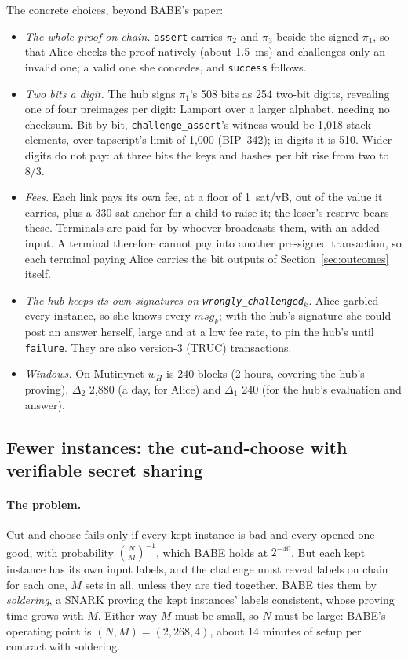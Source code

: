 \documentclass[11pt]{article}
\newcommand{\tx}[1]{\texttt{#1}}
\begin{document}
The concrete choices, beyond BABE's paper:
\begin{itemize}[leftmargin=1.5em]
\item \emph{The whole proof on chain.} \tx{assert} carries $\pi_2$ and
  $\pi_3$ beside the signed $\pi_1$, so that Alice checks the proof
  natively (about 1.5~ms) and challenges only an invalid one; a valid
  one she concedes, and \tx{success} follows.
\item \emph{Two bits a digit.} The hub signs $\pi_1$'s 508 bits as 254
  two-bit digits, revealing one of four preimages per digit: Lamport
  over a larger alphabet, needing no checksum. Bit by bit,
  \tx{challenge\_assert}'s witness would be 1,018 stack elements, over
  tapscript's limit of 1,000 (BIP~342); in digits it is 510. Wider digits
  do not pay: at three bits the keys and hashes per bit rise from two to
  $8/3$.
\item \emph{Fees.} Each link pays its own fee, at a floor of 1~sat/vB,
  out of the value it carries, plus a 330-sat anchor for a child to
  raise it; the loser's reserve bears these. Terminals are paid for by
  whoever broadcasts them, with an added input. A terminal therefore
  cannot pay into another pre-signed transaction, so each terminal paying
  Alice carries the bit outputs of Section~\ref{sec:outcomes} itself.
\item \emph{The hub keeps its own signatures on
  \tx{wrongly\_challenged}$_k$.} Alice garbled every instance, so she
  knows every $\mathit{msg}_k$; with the hub's signature she could post
  an answer herself, large and at a low fee rate, to pin the hub's
  until \tx{failure}. They are also version-3 (TRUC) transactions.
\item \emph{Windows.} On Mutinynet $w_H$ is 240 blocks (2 hours, covering
  the hub's proving), $\Delta_2$ 2,880 (a day, for Alice) and $\Delta_1$
  240 (for the hub's evaluation and answer).
\end{itemize}

\subsection{Fewer instances: the cut-and-choose with verifiable secret sharing}
\label{app:vsss}

\paragraph{The problem.} Cut-and-choose fails only if every kept
instance is bad and every opened one good, with probability
$\binom{N}{M}^{-1}$, which BABE holds at $2^{-40}$. But each kept
instance has its own input labels, and the challenge must reveal labels
on chain for each one, $M$ sets in all, unless they are tied together.
BABE ties them by \emph{soldering}, a SNARK proving the kept instances'
labels consistent, whose proving time grows with $M$. Either way $M$
must be small, so $N$ must be large: BABE's operating point is $(N, M) =
(2{,}268, 4)$, about 14 minutes of setup per contract with soldering.
\end{document}
